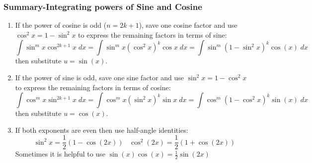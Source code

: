 \begin{frame}
\frametitle{Summary-Integrating powers of Sine and Cosine}
\small 
\begin{enumerate}
\item If the power of cosine is odd ($ n=2k+1 $), save one cosine factor and use $ \cos^2x=1-\sin^2x $ to express the remaining factors in terms of sine:
\[
\int \sin^m x \cos^{2k+1}x\;dx = \int \sin^mx(\cos^2 x)^k\cos x\; dx = \int \sin^m (1-\sin^2x)^k\cos(x)\; dx
\] 
then substitute $ u=\sin(x) $.

\item If the power of sine is odd, save one  sine factor and use $ \sin^2x=1-\cos^2x $ to express the remaining factors in terms of cosine:
\[
\int \cos^m x \sin^{2k+1}x\;dx = \int \cos^mx(\sin^2 x)^k\sin x\; dx
= \int \cos^m (1-\cos^2x)^k\sin(x)\; dx
\]
then substitute $ u=\cos(x) $.

\item If both exponents are even then use half-angle identities:
\[
\sin^2x=\frac12(1-\cos(2x)) \;\;\;\cos^2(2x)=\frac12(1+\cos(2x))
\]
Sometimes it is helpful to use $ \sin(x)\cos(x)=\frac12\sin(2x) $
\end{enumerate}

\end{frame}
